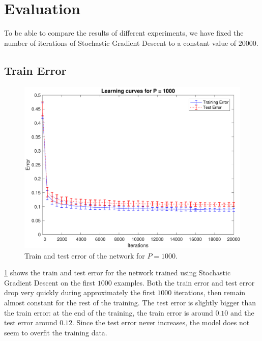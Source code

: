 \section{Evaluation}
\label{sec:evaluation}

To be able to compare the results of different experiments, we have fixed the number of iterations of Stochastic Gradient Descent to a constant value of $20000$.

\subsection{Train Error}
\begin{figure}[t]
	\centering
	\includegraphics[width=\columnwidth]{figures/error}
    \caption{Train and test error of the network for $P = 1000$.}
	\label{fig:training_error}
\end{figure}

\cref{fig:training_error} shows the train and test error for the network trained using Stochastic Gradient Descent on the first $1000$ examples.
Both the train error and test error drop very quickly during approximately the first $1000$ iterations, then remain almost constant for the rest of the training.
The test error is slightly bigger than the train error:
at the end of the training, the train error is around $0.10$ and the test error around $0.12$.
Since the test error never increases, the model does not seem to overfit the training data.

